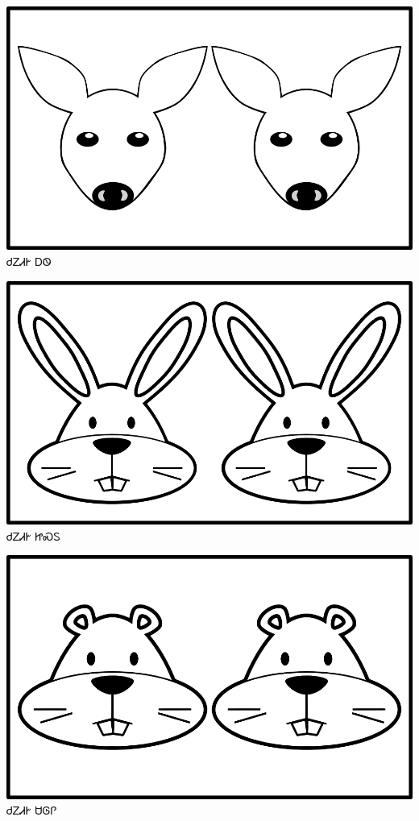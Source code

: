 \documentclass[avery5371]{flashcards}%
\begin{document}
\begin{flashcard}{
\includegraphics[width=0.95\columnwidth,height=.51\columnwidth,keepaspectratio]{../artwork/objects-animate/anitali-ahwi}
}\Huge ᏧᏃᏗᎨ ᎠᏫ
\end{flashcard}

\begin{flashcard}{
\includegraphics[width=0.95\columnwidth,height=.51\columnwidth,keepaspectratio]{../artwork/objects-animate/anitali-jisdu}
}\Huge ᏧᏃᏗᎨ ᏥᏍᏚ
\end{flashcard}

\begin{flashcard}{
\includegraphics[width=0.95\columnwidth,height=.51\columnwidth,keepaspectratio]{../artwork/objects-animate/anitali-saloli}
}\Huge ᏧᏃᏗᎨ ᏌᎶᎵ
\end{flashcard}
\end{document}
